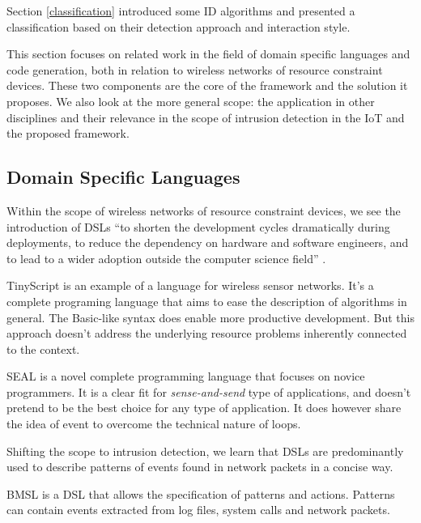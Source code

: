 \documentclass[conference]{IEEEtran}
\begin{document}
Section \ref{classification} introduced some ID
algorithms \cite{ganeriwal2008reputation,mishra2004intrusion,krontiris2009cooperative}
and presented a classification \cite{mishra2004intrusion,ioannis2007towards,alrajeh2013intrusion}
based on their detection approach and interaction style.

This section focuses on related work in the field of domain specific languages
and code generation, both in relation to wireless networks of resource
constraint devices. These two components are the core of the \NAME framework
and the solution it proposes. We also look at the more general scope: the
application in other disciplines and their relevance in the scope of intrusion
detection in the IoT and the proposed \NAME framework.

\subsection{Domain Specific Languages}

Within the scope of wireless networks of resource constraint devices, we see
the introduction of DSLs \enquote{to shorten the development cycles
dramatically during deployments, to reduce the dependency on hardware and
software engineers, and to lead to a wider adoption outside the computer
science field} \cite{sadilek2008domain,naumowicz2009prototyping}.

TinyScript \cite{levis2004tinyscript} is an example of a language for wireless
sensor networks. It's a complete programing language that aims to ease the
description of algorithms in general. The Basic-like syntax does enable more
productive development. But this approach doesn't address the underlying
resource problems inherently connected to the context.

SEAL \cite{elsts2013seal} is a novel complete programming language that focuses
on novice programmers. It is a clear fit for \emph{sense-and-send} type of
applications, and doesn't pretend to be the best choice for any type of
application. It does however share the idea of event to overcome the technical
nature of loops.

Shifting the scope to intrusion detection, we learn that DSLs are predominantly
used to describe patterns of events found in network
packets \cite{sekar1999high,roesch1999snort} in a concise way.

BMSL \cite{uppuluri2001experiences} is a DSL that allows the specification of
patterns and actions. Patterns can contain events extracted from log files,
system calls and network packets.
\end{document}

